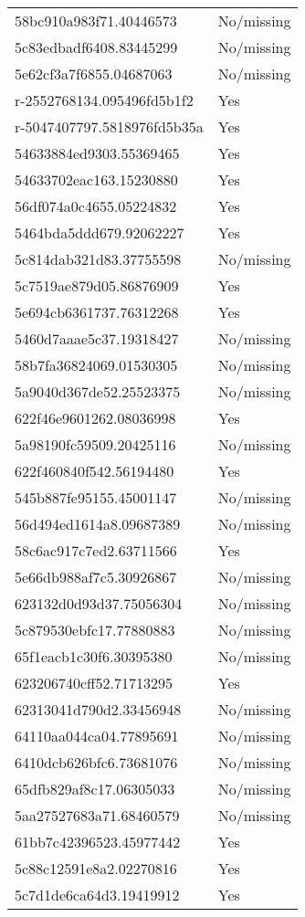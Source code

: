 \begin{tabular}{ll}
58bc910a983f71.40446573 & No/missing \\
5c83edbadf6408.83445299 & No/missing \\
5e62cf3a7f6855.04687063 & No/missing \\
r-2552768134.095496fd5b1f2 & Yes \\
r-5047407797.5818976fd5b35a & Yes \\
54633884ed9303.55369465 & Yes \\
54633702eac163.15230880 & Yes \\
56df074a0c4655.05224832 & Yes \\
5464bda5ddd679.92062227 & Yes \\
5c814dab321d83.37755598 & No/missing \\
5c7519ae879d05.86876909 & Yes \\
5e694cb6361737.76312268 & Yes \\
5460d7aaae5c37.19318427 & No/missing \\
58b7fa36824069.01530305 & No/missing \\
5a9040d367de52.25523375 & No/missing \\
622f46e9601262.08036998 & Yes \\
5a98190fc59509.20425116 & No/missing \\
622f460840f542.56194480 & Yes \\
545b887fe95155.45001147 & No/missing \\
56d494ed1614a8.09687389 & No/missing \\
58c6ac917c7ed2.63711566 & Yes \\
5e66db988af7c5.30926867 & No/missing \\
623132d0d93d37.75056304 & No/missing \\
5c879530ebfc17.77880883 & No/missing \\
65f1eacb1c30f6.30395380 & No/missing \\
623206740cff52.71713295 & Yes \\
62313041d790d2.33456948 & No/missing \\
64110aa044ca04.77895691 & No/missing \\
6410dcb626bfc6.73681076 & No/missing \\
65dfb829af8c17.06305033 & No/missing \\
5aa27527683a71.68460579 & No/missing \\
61bb7c42396523.45977442 & Yes \\
5c88c12591e8a2.02270816 & Yes \\
5c7d1de6ca64d3.19419912 & Yes \\

\end{tabular}
